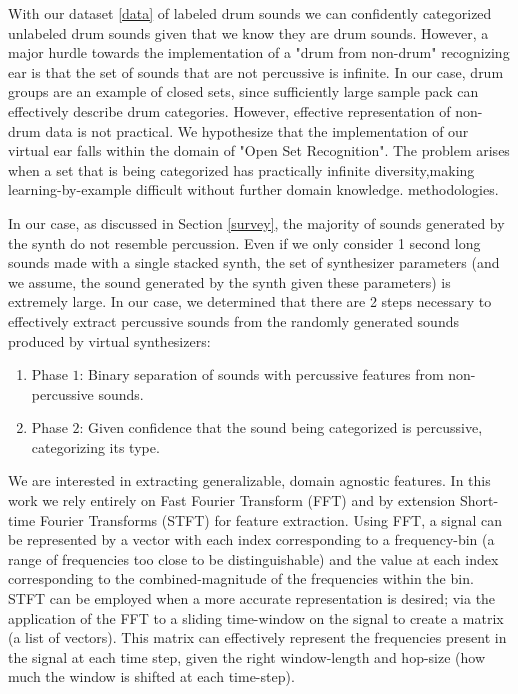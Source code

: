 \documentclass{nime-alternate} %
\begin{document}
 With our dataset \ref{data} of labeled drum sounds we can confidently categorized unlabeled drum sounds given that we know they are drum sounds. However, a major hurdle towards the implementation of a "drum from non-drum" recognizing ear is that the set of sounds that are not percussive is infinite.
In our case, drum groups are an example of closed sets, since sufficiently large sample pack can effectively describe drum categories. However, effective representation of non-drum data is not practical. We hypothesize that the implementation of our virtual ear falls within the domain of "Open Set Recognition"\cite{scheirer2012toward}. The problem arises when a set that is being categorized has practically infinite diversity,making learning-by-example difficult without further domain knowledge.  methodologies\cite{geng2018recent,mundt2019open}.
 
  In our case, as discussed in Section \ref{survey}, the majority of sounds generated by the synth do not resemble percussion. Even if we only consider 1 second long sounds made with a single stacked synth, the set of synthesizer parameters (and we assume, the sound generated by the synth given these parameters) is extremely large. In our case, we determined that there are 2 steps necessary to effectively extract percussive sounds
  from the randomly generated sounds produced by virtual synthesizers: 
  \begin{enumerate}
   \item  Phase $1$: Binary separation of sounds with percussive features from non-percussive sounds.
   \item Phase $2$: Given confidence that the sound being categorized is percussive, categorizing its type.
 \end{enumerate}
We are interested in extracting generalizable, domain agnostic features. In this work we rely entirely on Fast Fourier Transform (FFT) and by extension Short-time Fourier Transforms (STFT) for feature extraction. Using FFT, a signal can be represented by a vector with each index corresponding to a frequency-bin (a range of frequencies too close to be distinguishable) and the value at each index corresponding to the combined-magnitude of the frequencies within the bin. STFT can be employed when a more accurate representation is desired; via the application of the FFT to a sliding time-window on the signal to create a matrix (a list of vectors). This matrix can effectively represent the frequencies present in the signal at each time step, given the right window-length and hop-size (how much the window is shifted at each time-step).
\end{document}
